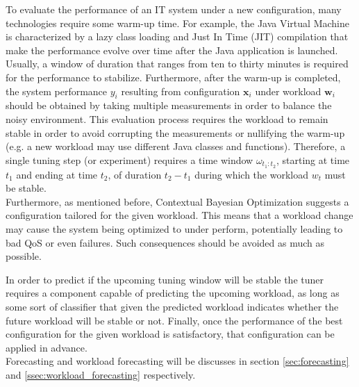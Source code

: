 \documentclass[a4paper, 12pt]{article} %
\begin{document}
	To evaluate the performance of an IT system under a new configuration, many technologies require some warm-up time. For example, the Java Virtual Machine is characterized by a lazy class loading and Just In Time (JIT) compilation that make the performance evolve over time after the Java application is launched. Usually, a window of duration that ranges from ten to thirty minutes is required for the performance to stabilize. Furthermore, after the warm-up is completed, the system performance $y_i$ resulting from configuration $\pmb{x}_i$ under workload $\pmb{w}_i$ should be obtained by taking multiple measurements in order to balance the noisy environment. This evaluation process requires the workload to remain stable in order to avoid corrupting the measurements or nullifying the warm-up (e.g. a new workload may use different Java classes and functions). Therefore, a single tuning step (or experiment) requires a time window $\omega_{t_1:t_2}$, starting at time $t_1$ and ending at time $t_2$, of duration $t_2 - t_1$ during which the workload $w_t$ must be stable.\\
	Furthermore, as mentioned before, Contextual Bayesian Optimization suggests a configuration tailored for the given workload.  This means that a workload change may cause the system being optimized to under perform, potentially leading to bad QoS or even failures. Such consequences should be avoided as much as possible.
	
	In order to predict if the upcoming tuning window will be stable the tuner requires a component capable of predicting the upcoming workload, as long as some sort of classifier that given the predicted workload indicates whether the future workload will be stable or not.
	Finally, once the performance of the best configuration for the given workload is satisfactory, that configuration can be applied in advance.\\
	Forecasting and workload forecasting will be discusses in section \ref{sec:forecasting} and \ref{ssec:workload_forecasting} respectively.
	
\end{document}
